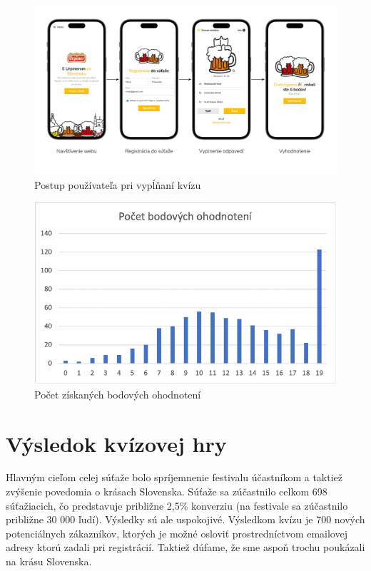 \documentclass[10pt,twoside,slovak,a4paper]{article}
\begin{document}
\begin{figure}[h]
	\centering
	\includegraphics[scale=0.25]{Diagram.pdf}

\caption{Postup používateľa pri vypĺňaní kvízu}

\end{figure}

\begin{figure}[h]
	\centering
	\includegraphics[scale=0.6]{Graf1.pdf}	

\caption{Počet získaných bodových ohodnotení}

\end{figure}


\section{Výsledok kvízovej hry}
Hlavným cieľom celej súťaže bolo spríjemnenie festivalu účastníkom a taktiež zvýšenie povedomia o krásach Slovenska. Súťaže sa zúčastnilo celkom 698 súťažiacich, čo predstavuje približne 2,5\% konverziu (na festivale sa zúčastnilo približne 30 000 ľudí). Výsledky sú ale uspokojivé. Výsledkom kvízu je 700 nových potenciálnych zákazníkov, ktorých je možné osloviť prostredníctvom emailovej adresy ktorú zadali pri registrácií. Taktiež dúfame, že sme aspoň trochu poukázali na krásu Slovenska.
\end{document}
